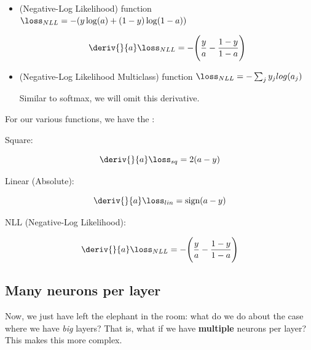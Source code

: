 \begin{itemize}
            \item {} (Negative-Log Likelihood) function $\loss_{NLL} = -( y \log(a) + (1-y) \log(1-a) )$
            
                \begin{equation}
                    \deriv{}{a} \loss_{NLL} = - \Bigg( \frac{y}{a} - \frac{1-y}{1-a} \Bigg)
                \end{equation}
            
            \item {} (Negative-Log Likelihood Multiclass) function $\loss_{NLL} = - \sum_j y_jlog(a_j)$
            
                Similar to softmax, we will omit this derivative.\\
        \end{itemize}
        
        \begin{notation}
            For our various  functions, we have the :
            
            Square:
            
            \begin{equation*}
                \deriv{}{a} \loss_{sq} = 2(a-y)
            \end{equation*}
            
            Linear (Absolute):
            
            \begin{equation*}
                \deriv{}{a} \loss_{lin} = \text{sign}(a-y)
            \end{equation*}
            
            NLL (Negative-Log Likelihood):
            
            \begin{equation*}
                \deriv{}{a} \loss_{NLL} = - \Bigg( \frac{y}{a} - \frac{1-y}{1-a} \Bigg)
            \end{equation*}
        \end{notation}
        
    \phantom{}
    
    \subsection{Many neurons per layer}
    
        Now, we just have left the elephant in the room: what do we do about the case where we have \textit{big} layers? That is, what if we have \textbf{multiple} neurons per layer? This makes this more complex.
        
